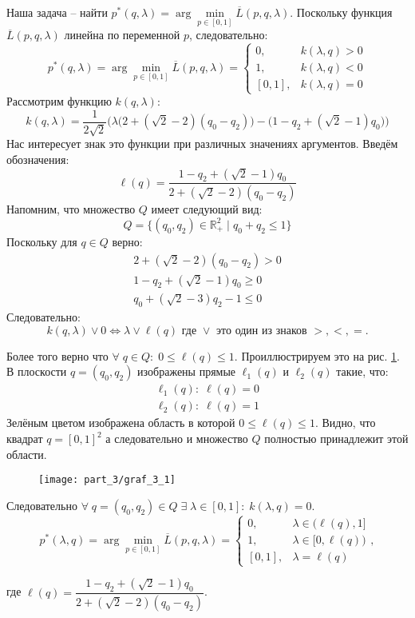 Наша задача -- найти 
$p^*(q, \lambda)=\arg \min \limits_{p \in [0, 1]} \overline{L}(p,q,\lambda)$.
Поскольку функция $\overline{L}(p,q,\lambda)$ линейна по переменной 
$p$, следовательно:
$$
	p^*(q, \lambda) =
	\arg \min \limits_{p \in [0, 1]} \overline{L}(p,q,\lambda) =
	\begin{cases}
		0, & k(\lambda,q)>0 \\
		1, & k(\lambda,q)<0 \\
		[0,1], & k(\lambda,q)=0
	\end{cases}	
$$
Рассмотрим функцию $k(q, \lambda)$:
$$
	k(q, \lambda)=\frac{1}{2\sqrt{2}}
	\Big(
		\lambda \big (2+(\sqrt{2}-2)(q_0-q_2) \big) -
		\big (1 - q_2 + (\sqrt{2} - 1)q_0 \big)
	\Big)
$$
Нас интересует знак это функции при различных значениях аргументов.
Введём обозначения:
$$
	\ell(q) = \frac{1 - q_2 + (\sqrt{2} - 1)q_0}{2+(\sqrt{2}-2)(q_0-q_2)}
$$
Напомним, что множество $Q$ имеет следующий вид:
$$
	Q = \{
		(q_0,q_2) \in \mathbb{R}^2_{+} \; | \;
		q_0 + q_2 \leqslant 1
	\}	
$$	
Поскольку для $q \in Q$ верно: 
\begin{gather*}
	2+(\sqrt{2}-2)(q_0-q_2) > 0 
	\\
	1 - q_2 + (\sqrt{2} - 1)q_0 \geqslant 0 
	\\
	q_0 + (\sqrt{2} - 3) q_2 - 1 \leqslant 0
\end{gather*}
Следовательно:
$$
	k(q, \lambda) \vee 0 \Leftrightarrow 
	\lambda \vee \ell(q) \textrm{ где } \vee 
	\textrm{ это один из знаков } >,<,=.
$$
	
Более того верно что 
$\forall \; q \in Q: \; 0 \leqslant \ell(q) \leqslant 1$. 
Проиллюстрируем это на рис. \ref{fig:l}. 
В плоскости $q=(q_0,q_2)$ изображены 
прямые $\ell_1(q)$ и $\ell_2(q)$ такие, что:
\begin{gather*}
	\ell_1(q): \; \ell(q)=0 
	\\
	\ell_2(q): \; \ell(q)=1
\end{gather*}
Зелёным цветом изображена область в которой
$0 \leqslant \ell(q) \leqslant 1$.
Видно, что квадрат $q = [0,1]^2$ а следовательно и
множество $Q$ полностью принадлежит этой области.
\begin{figure}[H]
	\centering
  	\texttt{[image: part\_3/graf\_3\_1]}
  	\caption{}
  	\label{fig:l}
\end{figure}

Следовательно $\forall \; q=(q_0, q_2) \in Q \;
\exists \; \lambda \in [0,1]: \; k(\lambda,q)=0$.
\begin{equation}
	\label{eq:p*}
	p^*(\lambda,q)=
	\arg \min \limits_{p \in [0, 1]} \overline{L}(p,q,\lambda)=
	\begin{cases}
		0, & \lambda \in \big(\ell (q), 1\big] \\
		1, & \lambda \in \big[0, \ell(q) \big) \\
		[0,1], & \lambda=\ell(q)
	\end{cases},
\end{equation}

где $\ell(q)=\dfrac{1 - q_2 + (\sqrt{2} - 1)q_0}{2+(\sqrt{2}-2)(q_0-q_2)}$.